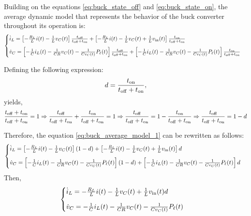 Building on the equations \eqref{eq:buck_state_off} and \eqref{eq:buck_state_on}, the average dynamic model that represents the behavior of the buck converter throughout its operation is:
\begin{equation}
  \begin{cases}
    \dot i_L = \left[- \frac{R_L} L i(t) - \frac{1}{L} v_C(t) \right] \frac{t_{\rm{off}}}{t_{\rm{off}} + t_{\rm{on}}} + \left[- \frac{R_L} L i(t) - \frac{1}{L} v_C(t) + \frac{1}{L} v_{\rm{in}}(t)\right] \frac{t_{\rm{on}}}{t_{\rm{off}} + t_{\rm{on}}} \\[8pt]
    \dot v_C = \left[- \frac{1}{C} i_L(t) - \frac{1}{C R} v_C(t) - \frac{1}{C v_C(t)} P_{\ell}(t)\right] \frac{t_{\rm{off}}}{t_{\rm{off}} + t_{\rm{on}}} + \left[- \frac{1}{C} i_L(t) - \frac{1}{C R} v_C(t) - \frac{1}{C v_C(t)} P_{\ell}(t)\right] \frac{t_{\rm{on}}}{t_{\rm{off}} + t_{\rm{on}}}
  \end{cases}
  \label{eq:buck_average_model_1}
\end{equation}

Defining the following expression:
\begin{equation}
  d = \frac{t_{\rm{on}}}{t_{\rm{off}} + t_{\rm{on}}},
\end{equation}
yields,
\begin{equation}
  \frac{t_{\rm{off}} + t_{\rm{on}}}{t_{\rm{off}} + t_{\rm{on}}} = 1 \Rightarrow
  \frac{t_{\rm{off}}}{t_{\rm{off}} + t_{\rm{on}}}
  + \frac{t_{\rm{on}}}{t_{\rm{off}} + t_{\rm{on}}} = 1 \Rightarrow
  \frac{t_{\rm{off}}}{t_{\rm{off}} + t_{\rm{on}}} = 1 - \frac{t_{\rm{on}}}{t_{\rm{off}} + t_{\rm{on}}} \Rightarrow
  \frac{t_{\rm{off}}}{t_{\rm{off}} + t_{\rm{on}}} = 1 - d
\end{equation}

Therefore, the equation \eqref{eq:buck_average_model_1} can be rewritten as follows:
\begin{equation*}
  \begin{cases}
    \dot i_L = \left[- \frac{R_L} L i(t) - \frac{1}{L} v_C(t) \right] \left(1 - d\right) + \left[- \frac{R_L} L i(t) - \frac{1}{L} v_C(t) + \frac{1}{L} v_{\rm{in}}(t)\right] d \\[8pt]
    \dot v_C = \left[- \frac{1}{C} i_L(t) - \frac{1}{C R} v_C(t) - \frac{1}{C v_C(t)} P_{\ell}(t)\right] \left(1 - d\right) + \left[- \frac{1}{C} i_L(t) - \frac{1}{C R} v_C(t) - \frac{1}{C v_C(t)} P_{\ell}(t)\right] d
  \end{cases}
\end{equation*}
Then,
\begin{equation}
  \begin{cases}
    \dot i_L = - \frac{R_L} L i(t) - \frac{1}{L} v_C(t) + \frac{1}{L} v_{\rm{in}}(t) d \\[8pt]
    \dot v_C = - \frac{1}{C} i_L(t) - \frac{1}{C R} v_C(t) - \frac{1}{C v_C(t)} P_{\ell}(t)
  \end{cases}
  \label{eq:buck_conveter_nonlinear_model}
\end{equation}

